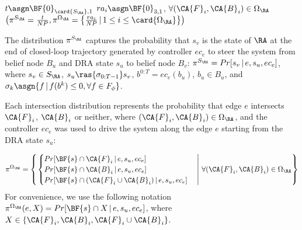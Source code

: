 \begin{algorithm}
\caption{$computeProb(e=(B_u, B_v), s_u, ec_e, \RA)$}
\label{alg:compute-prob}
\DontPrintSemicolon
{}
\BlankLine

$t \asgn \BF{0}_{\card{S_\RA}, 1}$\;
$ra_i \asgn \BF{0}_{3, 1}$, $\forall (\CA{F}_i, \CA{B}_i) \in \Omega_\RA$\;
\Return $\left( \pi^{S_\RA} = \frac{t}{NP}, \pi^{\Omega_\RA} = \left\{ \frac{ra_i}{NP} \,|\, 1\leq i\leq \card{\Omega_\RA} \right\} \right)$
\end{algorithm}

The distribution $\pi^{S_\RA}$ captures the probability that
$s_v$ is the state of $\RA$ at the end of closed-loop
trajectory generated by controller $ec_e$ to steer the system
from belief node $B_u$ and DRA state $s_u$ to belief node $B_v$:
$\pi^{S_\RA} = Pr[s_v \, |\, e, s_u, ec_e]$,
where $s_v \in S_\RA$, $s_{u} \ras{\sigma_{0:T-1}} s_v$,
$b^{0:T} = ec_e(b_u)$, $b_u \in B_u$, and
$\sigma_k \asgn \{ f \,|\, f(b^k) \leq 0, \forall f \in F_\phi \}$.

Each intersection distribution represents the probability that edge $e$
intersects $\CA{F}_i$, $\CA{B}_i$ or neither, where
$(\CA{F}_i, \CA{B}_i) \in \Omega_\RA$, and the controller $ec_e$
was used to drive the system along the edge $e$ starting from
the DRA state $s_u$:

{\footnotesize
\begin{equation}
\pi^{\Omega_\RA} = \left\{\left.
\begin{cases}
Pr[\BF{s}\cap \CA{F}_i \, |\, e, s_u, ec_e]\\
Pr[\BF{s}\cap \CA{B}_i \, |\, e, s_u, ec_e]\\
Pr[\BF{s}\cap (\CA{F}_i \cup \CA{B}_i) \, |\, e, s_u, ec_e]
\end{cases}
\,\right|\, \forall (\CA{F}_i, \CA{B}_i) \in \Omega_\RA \right\}
\end{equation}
}%
For convenience, we use the following notation
$\pi^{\Omega_\RA}(e, X) = Pr[\BF{s}\cap X \, |\, e, s_u, ec_e]$,
where $X \in \{\CA{F}_i, \CA{B}_i, \CA{F}_i \cup \CA{B}_i\}$.

